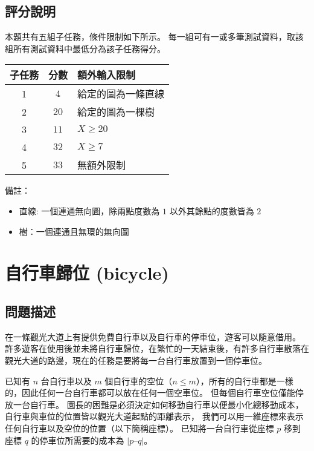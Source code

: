 \begin{example}
%
%
\end{example}

\subsection{評分說明}

本題共有五組子任務，條件限制如下所示。
每一組可有一或多筆測試資料，取該組所有測試資料中最低分為該子任務得分。

\begin{longtable}[]{@{}ccl@{}}
\toprule
子任務 & 分數 & 額外輸入限制 \\
\midrule
\endhead
1 & \(4\) & 給定的圖為一條直線 \\
2 & \(20\) & 給定的圖為一棵樹 \\
3 & \(11\) & \(X \ge 20\) \\
4 & \(32\) & \(X \ge 7\) \\
5 & \(33\) & 無額外限制 \\
\bottomrule
\end{longtable}

備註：

\begin{itemize}
\tightlist
\item
  直線: 一個連通無向圖，除兩點度數為 \(1\) 以外其餘點的度數皆為 \(2\)
\item
  樹：一個連通且無環的無向圖
\end{itemize}

\section{自行車歸位 (bicycle)}

\subsection{問題描述}

在一條觀光大道上有提供免費自行車以及自行車的停車位，遊客可以隨意借用。
許多遊客在使用後並未將自行車歸位，在繁忙的一天結束後，有許多自行車散落在觀光大道的路邊，現在的任務是要將每一台自行車放置到一個停車位。

已知有 \(n\) 台自行車以及 \(m\)
個自行車的空位（\(n \le m\)），所有的自行車都是一樣的，因此任何一台自行車都可以放在任何一個空車位。
但每個自行車空位僅能停放一台自行車。
園長的困難是必須決定如何移動自行車以便最小化總移動成本，自行車與車位的位置皆以觀光大道起點的距離表示，
我們可以用一維座標來表示任何自行車以及空位的位置（以下簡稱座標）。
已知將一台自行車從座標 \(p\) 移到座標 \(q\) 的停車位所需要的成本為
\(|p – q|\)。


